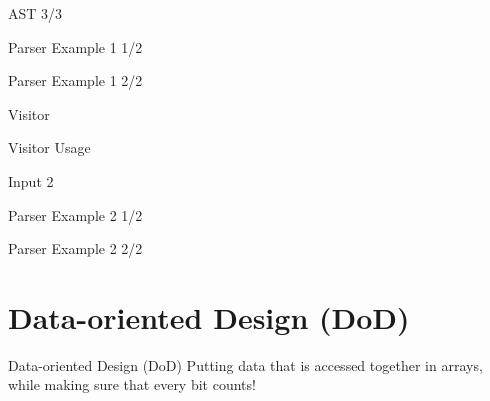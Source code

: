 \documentclass[aspectratio=169,notes]{beamer}
\begin{document}
	\begin{frame}[fragile]{AST 3/3}
		
	\end{frame}

	\begin{frame}[fragile]{Parser Example 1 1/2}
		
	\end{frame}

	\begin{frame}[fragile]{Parser Example 1 2/2}
		
	\end{frame}

	\begin{frame}[fragile]{Visitor}
		
	\end{frame}

	\begin{frame}[fragile]{Visitor Usage}
		
	\end{frame}

	\begin{frame}[fragile]{Input 2}
		
	\end{frame}

	\begin{frame}[fragile]{Parser Example 2 1/2}
		
	\end{frame}

	\begin{frame}[fragile]{Parser Example 2 2/2}
		
	\end{frame}

	\section{Data-oriented Design (DoD)}

	\begin{frame}[fragile]{Data-oriented Design (DoD)}
		\large
		\centering Putting data that is accessed together in arrays, while
			making sure that every bit counts!
	\end{frame}
\end{document}
